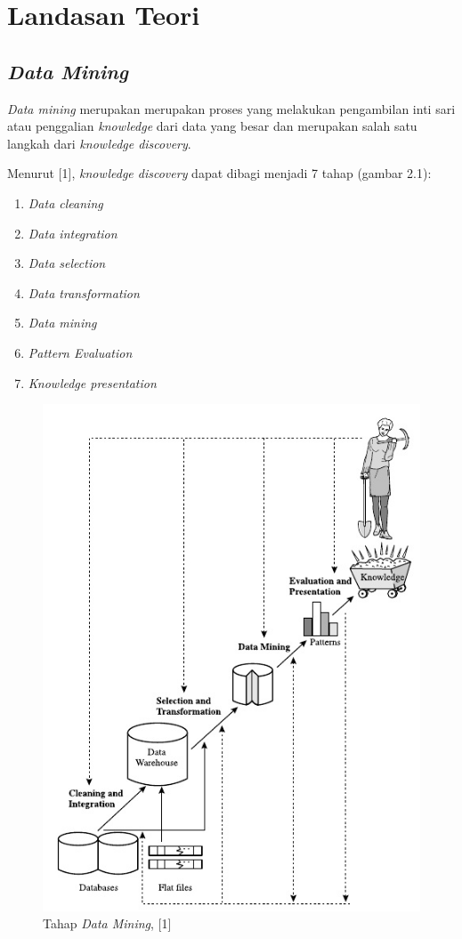 \chapter{Landasan Teori}
\label{chap:definition}

\section{\textsl{Data Mining}}

\textsl{Data mining} merupakan merupakan proses yang melakukan pengambilan inti sari atau penggalian \textsl{knowledge} dari data yang besar dan merupakan salah satu langkah dari \textsl{knowledge discovery}.

Menurut [1], \textsl{knowledge discovery} dapat dibagi menjadi 7 tahap (gambar 2.1):
\begin{enumerate}
	\item \textsl{Data cleaning}
	\item \textsl{Data integration}
	\item \textsl{Data selection}
	\item \textsl{Data transformation}
	\item \textsl {Data mining}
	\item \textsl{Pattern Evaluation}
	\item \textsl{Knowledge presentation}
\end{enumerate}

\begin{figure}
\includegraphics[scale=1]{Gambar/tahapdatamining.jpg}
\caption[Tahap \textsl{Data Mining}, [1]{Tahap \textsl{Data Mining}, [1]} 
\end{figure}

